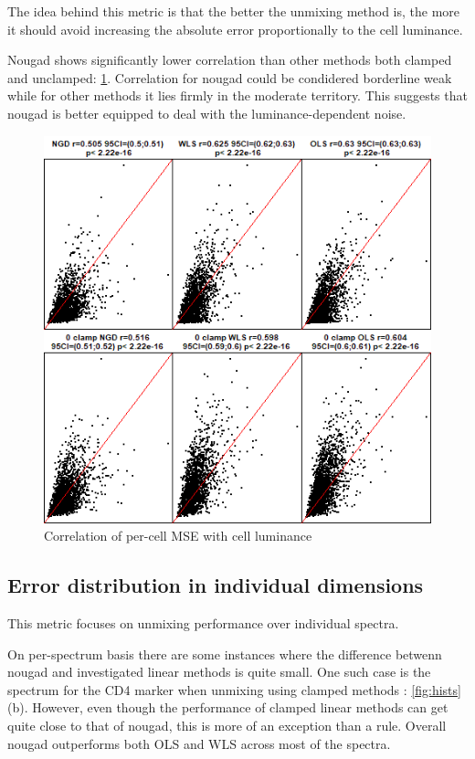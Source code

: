 The idea behind this metric is that the better the unmixing method is, the more it should avoid increasing the absolute error proportionally to the cell luminance.  

Nougad shows significantly lower correlation than other methods both clamped and unclamped: \cref{fig:bright_cell_cor}. Correlation for nougad could be condidered borderline weak while for other methods it lies firmly in the moderate territory\cite{cor2018}. This suggests that nougad is better equipped to deal with the luminance-dependent noise.

\begin{figure}
  \includegraphics[width=0.8\linewidth]{img/lumcorr.png}
  \caption{Correlation of per-cell MSE with cell luminance}
  \label{fig:bright_cell_cor}
\end{figure}

\subsection{Error distribution in individual dimensions}


This metric focuses on unmixing performance over individual spectra.

On per-spectrum basis there are some instances where the difference betwenn nougad and investigated linear methods is quite small. One such case is the spectrum for the CD4 marker when unmixing using clamped methods : \cref{fig:hists}(b). However, even though the performance of clamped linear methods can get quite close to that of nougad, this is more of an exception than a rule. Overall nougad outperforms both OLS and WLS across most of the spectra.


